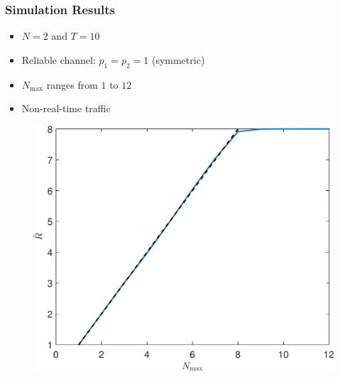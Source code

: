 \documentclass{beamer}
\begin{document}
\begin{frame}
\frametitle{Simulation Results}
\begin{itemize}
\item $N=2$ and $T=10$
\item Reliable channel: $p_1 = p_2 = 1$ (symmetric)
\item $N_\text{max}$ ranges from $1$ to $12$
\item Non-real-time traffic
\end{itemize}
\begin{figure}
\centering
\includegraphics[height=.5\textheight]{nonrealtime_throughput_randmax.pdf}
\end{figure}
\end{frame}
\end{document}
